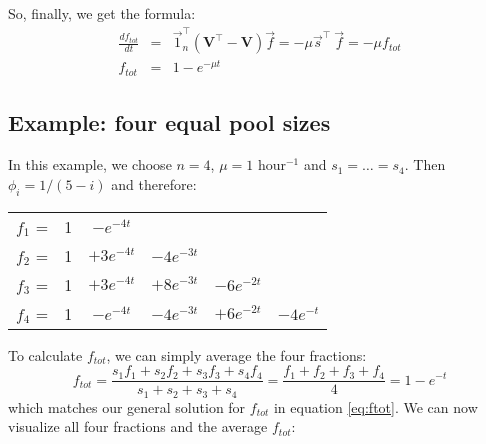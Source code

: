\documentclass{article}
\begin{document}
So, finally, we get the formula:
\begin{eqnarray}
	\frac{d f_{tot}}{dt} &=& \vec{1}_n^\top \left(\mathbf{V}^\top - \mathbf{V} \right) \vec{f} = -\mu \vec{s}^\top~\vec{f} = -\mu f_{tot} \\
	f_{tot} &=& 1 - e^{-\mu t} \label{eq:ftot}
\end{eqnarray}

\subsection{Example: four equal pool sizes}
In this example, we choose $n = 4$, $\mu = 1$ hour$^{-1}$ and $s_1 = \ldots = s_4$. Then $\phi_i = 1/(5-i)$ and therefore:
\begin{center}
\begin{tabular}{cccccc}
    $f_1$ = & 1 & $- e^{-4t}$ &&&\\
    $f_2$ = & 1 & $+ 3 e^{-4t}$ & $- 4 e^{-3t}$ &&\\
    $f_3$ = & 1 & $+ 3 e^{-4t}$ & $+ 8 e^{-3t}$ & $- 6 e^{-2t}$ &\\
    $f_4$ = & 1 & $- e^{-4t}$   & $- 4 e^{-3t}$ & $+ 6 e^{-2t}$ & $- 4 e^{-t}$
\end{tabular}
\end{center}

To calculate $f_{tot}$, we can simply average the four fractions:
\begin{equation}
    f_{tot} = \frac{s_1 f_1 + s_2 f_2 + s_3 f_3 + s_4 f_4}{s_1 + s_2 + s_3 + s_4} = \frac{f_1 + f_2 + f_3 + f_4}{4} = 1 - e^{-t}
\end{equation}
which matches our general solution for $f_{tot}$ in equation \ref{eq:ftot}. We can now visualize all four fractions and the average $f_{tot}$:
\begin{center}
\end{center}
\end{document}
